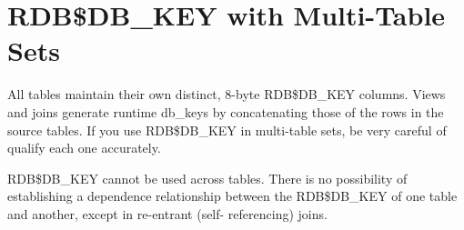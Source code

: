 \documentclass[a4paper,12pt,oneside]{book}
\begin{document}
\section{RDB\$DB\_KEY with Multi-Table Sets}
All tables maintain their own distinct, 8-byte RDB\$DB\_KEY columns. Views and joins generate 
runtime db\_keys by concatenating those of the rows in the source tables. If you use RDB\$DB\_KEY 
in multi-table sets, be very careful of qualify each one accurately.

RDB\$DB\_KEY cannot be used across tables. There is no possibility of establishing a dependence 
relationship between the RDB\$DB\_KEY of one table and another, except in re-entrant (self-
referencing) joins.
\end{document}
